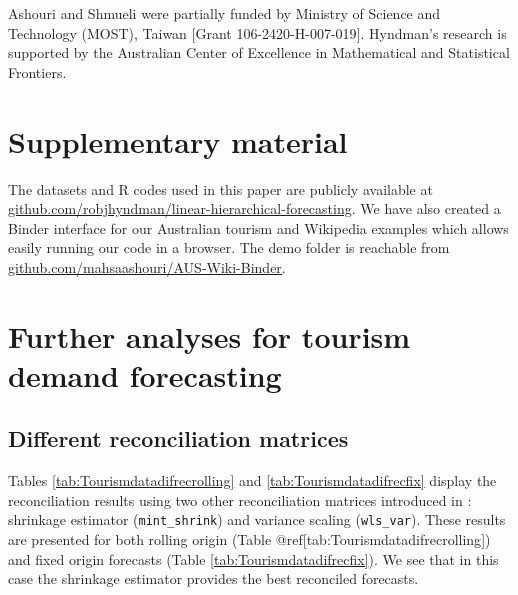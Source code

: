 \documentclass[11pt,a4paper,]{article}
\begin{document}
Ashouri and Shmueli were partially funded by Ministry of Science and Technology (MOST), Taiwan {[}Grant 106-2420-H-007-019{]}. Hyndman's research is supported by the Australian Center of Excellence in Mathematical and Statistical Frontiers.

\hypertarget{supplementary-material}{%
\section*{Supplementary material}\label{supplementary-material}}

The datasets and R codes used in this paper are publicly available at \url{github.com/robjhyndman/linear-hierarchical-forecasting}. We have also created a Binder interface for our Australian tourism and Wikipedia examples which allows easily running our code in a browser. The demo folder is reachable from \url{github.com/mahsaashouri/AUS-Wiki-Binder}.

\clearpage

\hypertarget{appendix-appendix}{%
\appendix}


\hypertarget{further-analyses-for-tourism-demand-forecasting}{%
\section{Further analyses for tourism demand forecasting}\label{further-analyses-for-tourism-demand-forecasting}}

\hypertarget{different-reconciliation-matrices}{%
\subsection{Different reconciliation matrices}\label{different-reconciliation-matrices}}

Tables \ref{tab:Tourismdatadifrecrolling} and \ref{tab:Tourismdatadifrecfix} display the reconciliation results using two other reconciliation matrices introduced in \autocite{mint2018}: shrinkage estimator (\texttt{mint\_shrink}) and variance scaling (\texttt{wls\_var}). These results are presented for both rolling origin (Table @ref{[}tab:Tourismdatadifrecrolling{]}) and fixed origin forecasts (Table \ref{tab:Tourismdatadifrecfix}). We see that in this case the shrinkage estimator provides the best reconciled forecasts.
\end{document}
